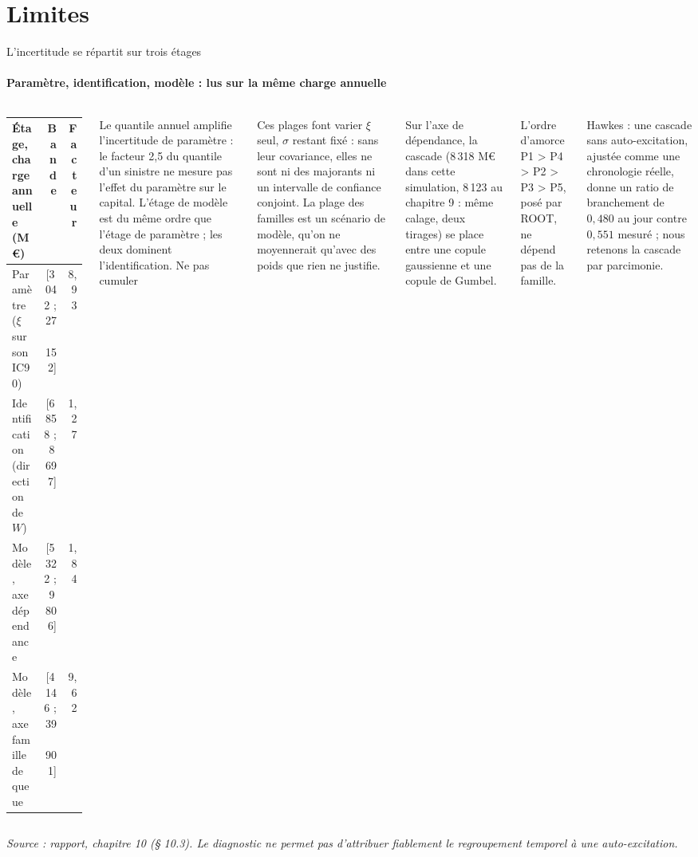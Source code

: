 \documentclass[aspectratio=169,10pt,t]{beamer}
\newcommand{\source}[1]{\par\vfill{\tiny\color{gris}\textit{Source : #1}}\par\vspace{-1mm}}
\renewcommand{\arraystretch}{1.25}
\begin{document}
\section{Limites}
\begin{frame}{L'incertitude se répartit sur trois étages}
  \suivimethode{}{}
  \framesubtitle{\ajout Paramètre, identification, modèle : lus sur la même charge annuelle}
  \begin{columns}[T,onlytextwidth]
    \footnotesize
    \renewcommand{\arraystretch}{1.2}
    \begin{tabularx}{\linewidth}{@{}Y r r@{}}
      \toprule
      Étage, charge annuelle (M€) & Bande & Facteur \\
      \midrule
      Paramètre ($\xi$ sur son IC90) & [3\,042 ; 27\,152] & 8,93 \\
      Identification (direction de $W$) & [6\,858 ; 8\,697] & 1,27 \\
      Modèle, axe dépendance & [5\,322 ; 9\,806] & 1,84 \\
      Modèle, axe famille de queue & [4\,146 ; 39\,901] & 9,62 \\
      \bottomrule
    \end{tabularx}\par\vspace{2mm}
    Le quantile annuel amplifie l'incertitude de paramètre : le facteur 2,5 du quantile d'un sinistre ne mesure pas l'effet du paramètre sur le capital. L'étage de modèle est du même ordre que l'étage de paramètre ; les deux dominent l'identification.
    \footnotesize
    {\editorial\normalsize Ne pas cumuler}\par\vspace{1.5mm}
    Ces plages font varier $\xi$ seul, $\sigma$ restant fixé : sans leur covariance, elles ne sont ni des majorants ni un intervalle de confiance conjoint. La plage des familles est un scénario de modèle, qu'on ne moyennerait qu'avec des poids que rien ne justifie.\par\vspace{1.5mm}
    Sur l'axe de dépendance, la cascade (8\,318 M€ dans cette simulation, 8\,123 au chapitre 9 : même calage, deux tirages) se place entre une copule gaussienne et une copule de Gumbel.\par\vspace{1.5mm}
    L'ordre d'amorce P1 > P4 > P2 > P3 > P5, posé par ROOT, ne dépend pas de la famille.\par\vspace{1.5mm}
    Hawkes : une cascade sans auto-excitation, ajustée comme une chronologie réelle, donne un ratio de branchement de $0{,}480$ au jour contre $0{,}551$ mesuré ; nous retenons la cascade par parcimonie.
  \end{columns}
  \source{rapport, chapitre 10 (§ 10.3). Le diagnostic ne permet pas d'attribuer fiablement le regroupement temporel à une auto-excitation.}
\end{frame}
\end{document}
